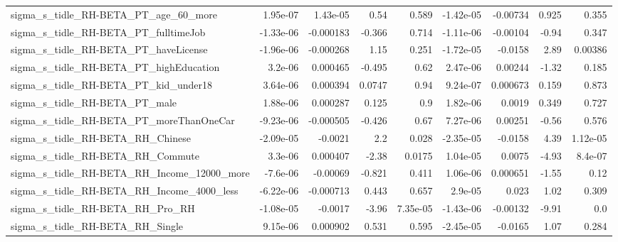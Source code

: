 \begin{tabular}{lrrrrrrrr}
sigma\_s\_tidle\_RH-BETA\_PT\_age\_60\_more               &    1.95e-07 &     1.43e-05 &      0.54 &    0.589 &  -1.42e-05 &    -0.00734 &        0.925 &         0.355 \\
sigma\_s\_tidle\_RH-BETA\_PT\_fulltimeJob               &   -1.33e-06 &    -0.000183 &    -0.366 &    0.714 &  -1.11e-06 &    -0.00104 &        -0.94 &         0.347 \\
sigma\_s\_tidle\_RH-BETA\_PT\_haveLicense               &   -1.96e-06 &    -0.000268 &      1.15 &    0.251 &  -1.72e-05 &     -0.0158 &         2.89 &       0.00386 \\
sigma\_s\_tidle\_RH-BETA\_PT\_highEducation             &     3.2e-06 &     0.000465 &    -0.495 &     0.62 &   2.47e-06 &     0.00244 &        -1.32 &         0.185 \\
sigma\_s\_tidle\_RH-BETA\_PT\_kid\_under18               &    3.64e-06 &     0.000394 &    0.0747 &     0.94 &   9.24e-07 &    0.000673 &        0.159 &         0.873 \\
sigma\_s\_tidle\_RH-BETA\_PT\_male                      &    1.88e-06 &     0.000287 &     0.125 &      0.9 &   1.82e-06 &      0.0019 &        0.349 &         0.727 \\
sigma\_s\_tidle\_RH-BETA\_PT\_moreThanOneCar            &   -9.23e-06 &    -0.000505 &    -0.426 &     0.67 &   7.27e-06 &     0.00251 &        -0.56 &         0.576 \\
sigma\_s\_tidle\_RH-BETA\_RH\_Chinese                   &   -2.09e-05 &      -0.0021 &       2.2 &    0.028 &  -2.35e-05 &     -0.0158 &         4.39 &      1.12e-05 \\
sigma\_s\_tidle\_RH-BETA\_RH\_Commute                   &     3.3e-06 &     0.000407 &     -2.38 &   0.0175 &   1.04e-05 &      0.0075 &        -4.93 &       8.4e-07 \\
sigma\_s\_tidle\_RH-BETA\_RH\_Income\_12000\_more         &    -7.6e-06 &     -0.00069 &    -0.821 &    0.411 &   1.06e-06 &    0.000651 &        -1.55 &          0.12 \\
sigma\_s\_tidle\_RH-BETA\_RH\_Income\_4000\_less          &   -6.22e-06 &    -0.000713 &     0.443 &    0.657 &    2.9e-05 &       0.023 &         1.02 &         0.309 \\
sigma\_s\_tidle\_RH-BETA\_RH\_Pro\_RH                    &   -1.08e-05 &      -0.0017 &     -3.96 & 7.35e-05 &  -1.43e-06 &    -0.00132 &        -9.91 &           0.0 \\
sigma\_s\_tidle\_RH-BETA\_RH\_Single                    &    9.15e-06 &     0.000902 &     0.531 &    0.595 &  -2.45e-05 &     -0.0165 &         1.07 &         0.284 \\

\end{tabular}

